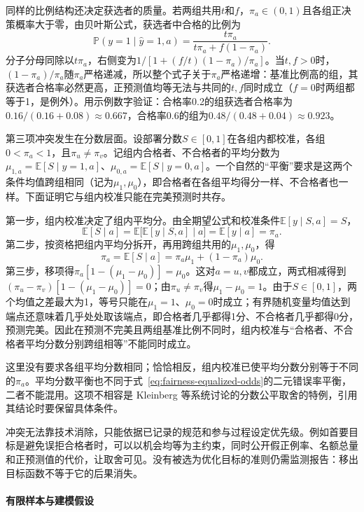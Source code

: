 同样的比例结构还决定获选者的质量。若两组共用$t$和$f$，$\pi_a\in(0,1)$且各组正决策概率大于零，由贝叶斯公式，获选者中合格的比例为
\begin{equation}
 \mathbb P(y=1\mid\hat y=1,a)
 =\frac{t\pi_a}{t\pi_a+f(1-\pi_a)}.
 \label{eq:fairness-predictive-value}
\end{equation}
分子分母同除以$t\pi_a$，右侧变为$1/[1+(f/t)(1-\pi_a)/\pi_a]$。当$t,f>0$时，$(1-\pi_a)/\pi_a$随$\pi_a$严格递减，所以整个式子关于$\pi_a$严格递增：基准比例高的组，其获选者合格率必然更高，正预测值均等无法与共同的$t,f$同时成立（$f=0$时两组都等于1，是例外）。用示例数字验证：合格率0.2的组获选者合格率为$0.16/(0.16+0.08)\approx0.667$，合格率0.6的组为$0.48/(0.48+0.04)\approx0.923$。

第三项冲突发生在分数层面。设部署分数$S\in[0,1]$在各组内都校准，各组$0<\pi_a<1$，且$\pi_u\neq\pi_v$。记组内合格者、不合格者的平均分数为$\mu_{1,a}=\mathbb E[S\mid y=1,a]$、$\mu_{0,a}=\mathbb E[S\mid y=0,a]$。一个自然的“平衡”要求是这两个条件均值跨组相同（记为$\mu_1,\mu_0$），即合格者在各组平均得分一样、不合格者也一样。下面证明它与组内校准只能在完美预测时共存。

第一步，组内校准决定了组内平均分。由全期望公式和校准条件$\mathbb E[y\mid S,a]=S$，
\[
 \mathbb E[S\mid a]=\mathbb E\bigl[\mathbb E[y\mid S,a]\mid a\bigr]=\mathbb E[y\mid a]=\pi_a.
\]
第二步，按资格把组内平均分拆开，再用跨组共用的$\mu_1,\mu_0$，得
\[
 \pi_a=\mathbb E[S\mid a]=\pi_a\mu_1+(1-\pi_a)\mu_0.
\]
第三步，移项得$\pi_a[1-(\mu_1-\mu_0)]=\mu_0$。这对$a=u,v$都成立，两式相减得到$(\pi_u-\pi_v)[1-(\mu_1-\mu_0)]=0$；由$\pi_u\neq\pi_v$得$\mu_1-\mu_0=1$。由于$S\in[0,1]$，两个均值之差最大为1，等号只能在$\mu_1=1$、$\mu_0=0$时成立；有界随机变量均值达到端点还意味着几乎处处取该端点，即合格者几乎都得1分、不合格者几乎都得0分，预测完美。因此在预测不完美且两组基准比例不同时，组内校准与“合格者、不合格者平均分数分别跨组相等”不能同时成立。

这里没有要求各组平均分数相同；恰恰相反，组内校准已使平均分数分别等于不同的$\pi_a$。平均分数平衡也不同于式~\eqref{eq:fairness-equalized-odds}的二元错误率平衡，二者不能混用。这项不相容是 Kleinberg 等系统讨论的分数公平取舍的特例，引用其结论时要保留具体条件。

冲突无法靠技术消除，只能依据已记录的规范和参与过程设定优先级。例如首要目标是避免误拒合格者时，可以以机会均等为主约束，同时公开假正例率、名额总量和正预测值的代价，让取舍可见。没有被选为优化目标的准则仍需监测报告：移出目标函数不等于它的后果消失。

\paragraph{有限样本与建模假设}
\label{sec:fairness-evidence}

